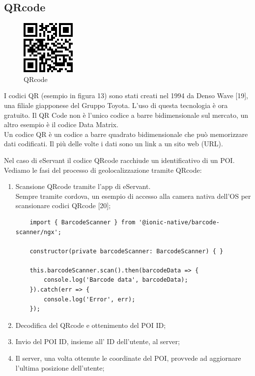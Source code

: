 \subsection{QRcode}
\begin{figure}[H]
    \centering  
    \caption{QRcode}
    \includegraphics[scale=1]{img/cap2/barcode-qrcode}
\end{figure}
I codici QR (esempio in figura 13) sono stati creati nel 1994 da Denso Wave [19], una filiale giapponese del Gruppo Toyota.
L'uso di questa tecnologia è ora gratuito. Il QR Code non è l'unico codice a barre bidimensionale 
sul mercato, un altro esempio è il codice Data Matrix.
\\
Un codice QR è un codice a barre quadrato bidimensionale che può memorizzare dati codificati. 
Il più delle volte i dati sono un link a un sito web (URL).

Nel caso di eServant il codice QRcode racchiude un identificativo di un POI. \\
Vediamo le fasi del processo di geolocalizzazione tramite QRcode:

\begin{enumerate}
    \item Scansione QRcode tramite l'app di eServant.\\
    Sempre tramite cordova, un esempio di accesso alla camera nativa dell'OS per scansionare
    codici QRcode [20];
\begin{lstlisting}
    import { BarcodeScanner } from '@ionic-native/barcode-scanner/ngx';
    
    constructor(private barcodeScanner: BarcodeScanner) { }
    
    this.barcodeScanner.scan().then(barcodeData => {
        console.log('Barcode data', barcodeData);
    }).catch(err => {
        console.log('Error', err);
    });
\end{lstlisting}

    \item Decodifica del QRcode e ottenimento del POI ID;
    \item Invio del POI ID, insieme all' ID dell'utente, al server;
    \item Il server, una volta ottenute le coordinate del POI, provvede ad aggiornare l'ultima posizione dell'utente;
\end{enumerate}



